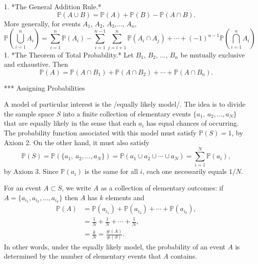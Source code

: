 1. *The General Addition Rule.*
   \begin{equation}
   \label{eq-general-addition-rule-1}
   \mathbb{P}(A\cup B)=\mathbb{P}(A)+\mathbb{P}(B)-\mathbb{P}(A\cap B).
   \end{equation}
   More generally, for events \(A_{1}\), \(A_{2}\), \(A_{3}\),..., \(A_{n}\),
   \begin{equation}
   \mathbb{P}\left(\bigcup_{i=1}^{n}A_{i}\right)=\sum_{i=1}^{n}\mathbb{P}(A_{i})-\sum_{i=1}^{n-1}\sum_{j=i+1}^{n}\mathbb{P}(A_{i}\cap A_{j})+\cdots+(-1)^{n-1}\mathbb{P}\left(\bigcap_{i=1}^{n}A_{i}\right)
   \end{equation}
1. *The Theorem of Total Probability.* Let \(B_{1}\), \(B_{2}\), ...,
   \(B_{n}\) be mutually exclusive and exhaustive. Then
   \begin{equation}
   \label{eq-theorem-total-probability}
   \mathbb{P}(A)=\mathbb{P}(A\cap B_{1})+\mathbb{P}(A\cap B_{2})+\cdots+\mathbb{P}(A\cap B_{n}).
   \end{equation}

*** Assigning Probabilities

A model of particular interest is the /equally likely model/. The idea
is to divide the sample space \(S\) into a finite collection of
elementary events \( \{ a_{1},\ a_{2}, \ldots, a_{N} \} \) that are
equally likely in the sense that each \(a_{i}\) has equal chances of
occurring. The probability function associated with this model must
satisfy \(\mathbb{P}(S)=1\), by Axiom 2. On the other hand, it must
also satisfy \[ \mathbb{P}(S)=\mathbb{P}( \{ a_{1},\
a_{2},\ldots,a_{N} \} )=\mathbb{P}(a_{1}\cup a_{2}\cup\cdots\cup
a_{N})=\sum_{i=1}^{N}\mathbb{P}(a_{i}), \] by Axiom 3. Since
\(\mathbb{P}(a_{i})\) is the same for all \(i\), each one necessarily
equals \(1/N\).

For an event \(A\subset S\), we write \(A\) as a collection of
elementary outcomes: if \( A = \{ a_{i_{1}}, a_{i_{2}}, \ldots,
a_{i_{k}} \} \) then \(A\) has \(k\) elements and
\begin{align*}
\mathbb{P}(A) & =\mathbb{P}(a_{i_{1}})+\mathbb{P}(a_{i_{2}})+\cdots+\mathbb{P}(a_{i_{k}}),\\
 & =\frac{1}{N}+\frac{1}{N}+\cdots+\frac{1}{N},\\
 & =\frac{k}{N}=\frac{\#(A)}{\#(S)}.
\end{align*}
In other words, under the equally likely model, the probability of an
event \(A\) is determined by the number of elementary events that
\(A\) contains.

